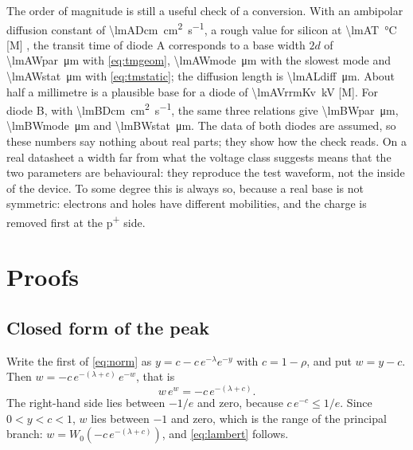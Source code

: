 \documentclass[10pt,a4paper]{scrartcl}
\begin{document}
The order of magnitude is still a useful check of a conversion. With an ambipolar diffusion constant of \SI{\lmADcm}{\centi\metre\squared\per\second}, a rough value for silicon at \SI{\lmAT}{\celsius} [M] \cite{lutz}, the transit time of diode A corresponds to a base width $2d$ of \SI{\lmAWpar}{\micro\metre} with \eqref{eq:tmgeom}, \SI{\lmAWmode}{\micro\metre} with the slowest mode and \SI{\lmAWstat}{\micro\metre} with \eqref{eq:tmstatic}; the diffusion length is \SI{\lmALdiff}{\micro\metre}. About half a millimetre is a plausible base for a diode of \SI{\lmAVrrmKv}{\kilo\volt} [M]. For diode B, with \SI{\lmBDcm}{\centi\metre\squared\per\second}, the same three relations give \SI{\lmBWpar}{\micro\metre}, \SI{\lmBWmode}{\micro\metre} and \SI{\lmBWstat}{\micro\metre}. The data of both diodes are assumed, so these numbers say nothing about real parts; they show how the check reads. On a real datasheet a width far from what the voltage class suggests means that the two parameters are behavioural: they reproduce the test waveform, not the inside of the device. To some degree this is always so, because a real base is not symmetric: electrons and holes have different mobilities, and the charge is removed first at the p\textsuperscript{+} side.

\section{Proofs}
\label{app:proofs}
\subsection{Closed form of the peak}
\label{app:lambert}
Write the first of \eqref{eq:norm} as $y = c - c\,e^{-\lambda}e^{-y}$ with $c = 1-\rho$, and put $w = y - c$. Then $w = -c\,e^{-(\lambda+c)}\,e^{-w}$, that is
\begin{equation}
w\,e^{w} = -c\,e^{-(\lambda+c)} .
\end{equation}
The right-hand side lies between $-1/e$ and zero, because $c\,e^{-c} \leq 1/e$. Since $0 < y < c < 1$, $w$ lies between $-1$ and zero, which is the range of the principal branch: $w = W_0(-c\,e^{-(\lambda+c)})$, and \eqref{eq:lambert} follows.
\end{document}
